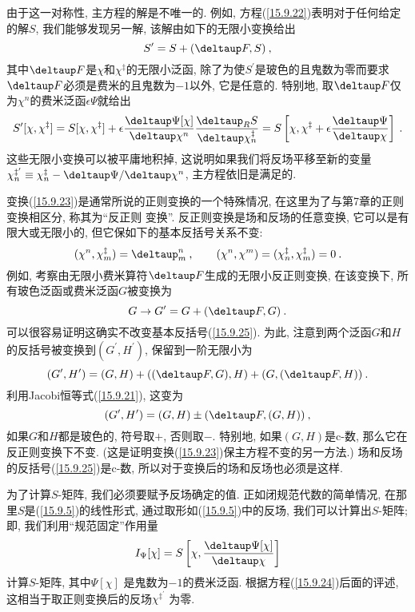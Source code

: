 由于这一对称性, 主方程的解是不唯一的. 例如, 方程(\ref{15.9.22})表明对于任何给定的解$S$, 我们能够发现另一解, 该解由如下的无限小变换给出
\begin{equation}
S^{\prime }=S+(\deltaup F,S)\:,   \label{15.9.23}
\end{equation}%
其中$\deltaup F$是$\chi $和$\chi ^{\ddag }$的无限小泛函, 除了为使$S^{\prime}$是玻色的且鬼数为零而要求$\deltaup F$必须是费米的且鬼数为$-1$以外, 
它是任意的. 特别地, 取$\deltaup F$仅为$\chi^{n}$的费米泛函$\epsilon \Psi $就给出
\begin{equation}
S^{\prime }[\chi ,\chi ^{\ddag }]=S[\chi ,\chi ^{\ddag }]+\epsilon \frac{%
\deltaup \Psi [ \chi ]}{\deltaup \chi ^{n}}\frac{\deltaup _{R}S}{\deltaup \chi
_{n}^{\ddag }}=S\left[ \chi ,\chi ^{\ddag }+\epsilon \frac{\deltaup \Psi }{%
\deltaup \chi }\right] \:.   \label{15.9.24}
\end{equation}%
这些无限小变换可以被平庸地积掉, 这说明如果我们将反场平移至新的变量$\chi _{n}^{\ddag^{ \prime}
}\equiv \chi _{n}^{\ddag }-\deltaup \Psi /\deltaup \chi ^{n}$, 主方程依旧是满足的.

变换(\ref{15.9.23})是通常所说的正则变换的一个特殊情况, 在这里为了与第7章的正则变换相区分, 称其为``反正则%
变换''. 反正则变换是场和反场的任意变换, 它可以是有限大或无限小的, 但它保如下的基本反括号关系不变:%
\begin{equation}
(\chi ^{n},\chi _{m}^{\ddag })=\deltaup _{m}^{n} \:, \qquad 
(\chi ^{n},\chi ^{m})=(\chi _{n}^{\ddag },\chi _{m}^{\ddag })=0\:. 
\label{15.9.25}
\end{equation}%
例如, 考察由无限小费米算符$\deltaup F$生成的无限小反正则变换, 在该变换下, 所有玻色泛函或费米泛函$G$被变换为
\begin{equation}
G\to G^{\prime }=G+(\deltaup F,G)\:.   \label{15.9.26}
\end{equation}%
可以很容易证明这确实不改变基本反括号(\ref{15.9.25}). 为此, 注意到两个泛函$G$和$H$的反括号被变换到$(G^{\prime },H^{\prime })$, 保留到一阶无限小为
\[
(G^{\prime },H^{\prime })=(G,H)+((\deltaup F,G),H)+(G,(\deltaup F,H))\:. 
\]%
利用Jacobi恒等式(\ref{15.9.21}), 这变为
\begin{equation}
(G^{\prime },H^{\prime })=(G,H)\pm (\deltaup F,(G,H))\:,   \label{15.9.27}
\end{equation}%
如果$G$和$H$都是玻色的, 符号取$+$, 否则取$-$. 特别地, 如果$(G,H)$是c-数, 那么它在反正则变换下不变. 
(这是证明变换(\ref{15.9.23})保主方程不变的另一方法.) 场和反场的反括号(\ref{15.9.25})是c-数, 所以对于变换后的场和反场也必须是这样.

为了计算$S$-矩阵, 我们必须要赋予反场确定的值. 正如闭规范代数的简单情况, 在那里$S$是(\ref{15.9.5})的线性形式, 通过取形如(\ref{15.9.5})中的反场, 
我们可以计算出$S$-矩阵; 即, 我们利用``规范固定''作用量
\begin{equation}
I_{\Psi }[\chi ]=S\left[ \chi ,\frac{\deltaup \Psi [ \chi ]}{\deltaup \chi}\right]   \label{15.9.28}
\end{equation}%
计算$S$-矩阵, 其中$\Psi [ \chi ]$%
是鬼数为$-1$的费米泛函. 根据方程(\ref{15.9.24})后面的评述, 这相当于取正则变换后的反场$\chi ^{\ddag ^{\prime }}$%
为零.

